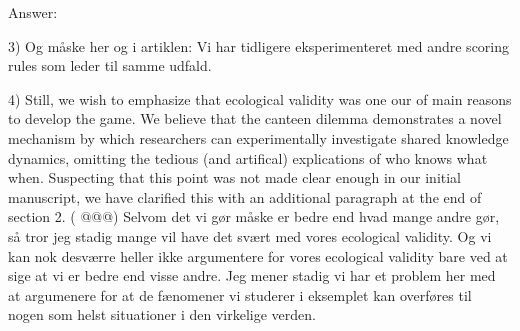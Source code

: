 \documentclass[a4paper]{article}
\newenvironment{robin}{\smallskip \noindent \color{red!10!green!50!blue}}{\color{black}\smallskip}
\newenvironment{tobo}{\smallskip \noindent \color{yellow!80!black!80}}{\color{black}\smallskip}
\begin{document}
\begin{robin}
Answer: 



3) 
\begin{tobo}
Og måske her og i artiklen: Vi har tidligere eksperimenteret med andre scoring rules som leder til samme udfald. 
\end{tobo}

4) Still, we wish to emphasize that ecological validity was one our of main reasons to develop the game. We believe that the canteen dilemma demonstrates a novel mechanism by which researchers can experimentally investigate shared knowledge dynamics, omitting the tedious (and artifical) explications of who knows what when. Suspecting that this point was not made clear enough in our initial manuscript, we have clarified this with an additional paragraph at the end of section 2. ( @@@)
\begin{tobo}
Selvom det vi gør måske er bedre end hvad mange andre gør, så tror jeg stadig mange vil have det svært med vores ecological validity. Og vi kan nok desværre heller ikke argumentere for vores ecological validity bare ved at sige at vi er bedre end visse andre. Jeg mener stadig vi har et problem her med at argumenere for at de fænomener vi studerer i eksemplet kan overføres til nogen som helst situationer i den virkelige verden. 
\end{tobo}


\end{robin}
\end{document}
